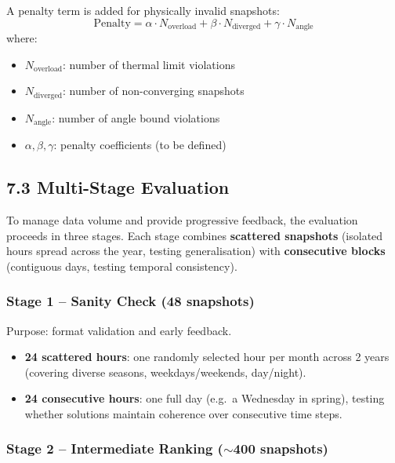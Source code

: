\documentclass[11pt,a4paper]{article}
\begin{document}
A penalty term is added for physically invalid snapshots:
%
\begin{equation}
  \text{Penalty} = \alpha \cdot N_{\text{overload}} + \beta \cdot N_{\text{diverged}} + \gamma \cdot N_{\text{angle}}
\end{equation}
%
where:
\begin{itemize}[nosep]
  \item $N_{\text{overload}}$: number of thermal limit violations
  \item $N_{\text{diverged}}$: number of non-converging snapshots
  \item $N_{\text{angle}}$: number of angle bound violations
  \item $\alpha, \beta, \gamma$: penalty coefficients (to be defined)
\end{itemize}

\subsection{7.3 Multi-Stage Evaluation}

To manage data volume and provide progressive feedback, the evaluation proceeds in three stages. Each stage combines \textbf{scattered snapshots} (isolated hours spread across the year, testing generalisation) with \textbf{consecutive blocks} (contiguous days, testing temporal consistency).

\subsubsection{Stage 1 -- Sanity Check (48 snapshots)}

Purpose: format validation and early feedback.

\begin{itemize}[nosep]
  \item \textbf{24 scattered hours}: one randomly selected hour per month across 2 years (covering diverse seasons, weekdays/weekends, day/night).
  \item \textbf{24 consecutive hours}: one full day (e.g.\ a Wednesday in spring), testing whether solutions maintain coherence over consecutive time steps.
\end{itemize}

\subsubsection{Stage 2 -- Intermediate Ranking ($\sim$400 snapshots)}
\end{document}
